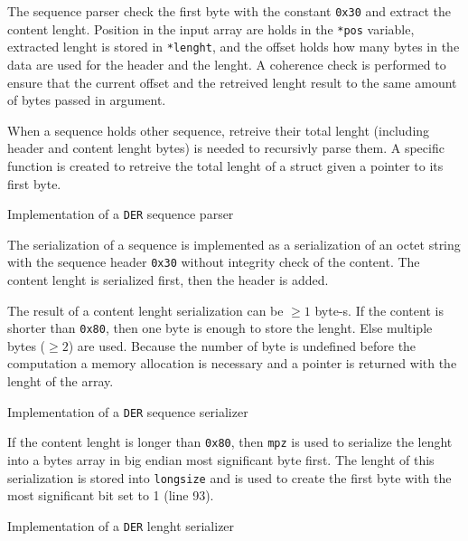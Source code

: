 The sequence parser check the first byte with the constant \texttt{0x30} and
extract the content lenght. Position in the input array are holds in the \texttt{*pos}
variable, extracted lenght is stored in \texttt{*lenght}, and the offset holds
how many bytes in the data are used for the header and the lenght. A coherence
check is performed to ensure that the current offset and the retreived lenght
result to the same amount of bytes passed in argument.

When a sequence holds other sequence, retreive their total lenght (including header
and content lenght bytes) is needed to recursivly parse them. A specific function
is created to retreive the total lenght of a struct given a pointer to its first
byte.

\begin{listing}
	\caption{Implementation of a \texttt{DER} sequence parser}
	\label{lst:implDERSequenceParser}
\end{listing}

The serialization of a sequence is implemented as a serialization of an octet string
with the sequence header \texttt{0x30} without integrity check of the content.
The content lenght is serialized first, then the header is added.

The result of a content lenght serialization can be $\geq 1$ byte-s. If the content
is shorter than \texttt{0x80}, then one byte is enough to store the lenght. Else
multiple bytes ($\geq 2$) are used. Because the number of byte is undefined before
the computation a memory allocation is necessary and a pointer is returned with
the lenght of the array.

\begin{listing}
	\caption{Implementation of a \texttt{DER} sequence serializer}
	\label{lst:implDERSequenceSerializer}
\end{listing}

If the content lenght is longer than \texttt{0x80}, then \texttt{mpz} is used to serialize
the lenght into a bytes array in big endian most significant byte first. The lenght
of this serialization is stored into \texttt{longsize} and is used to create the
first byte with the most significant bit set to 1 (line 93).

\begin{listing}
	\caption{Implementation of a \texttt{DER} lenght serializer}
	\label{lst:implDERLenghtSerializer}
\end{listing}

